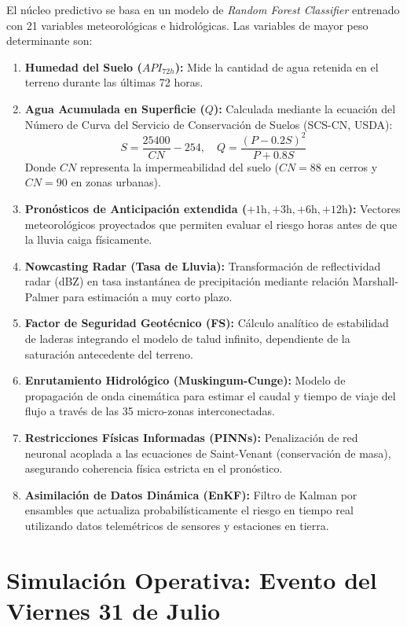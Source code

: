 \documentclass[11pt,a4paper]{article}
\begin{document}
El núcleo predictivo se basa en un modelo de \textit{Random Forest Classifier} entrenado con 21 variables meteorológicas e hidrológicas. Las variables de mayor peso determinante son:

\begin{enumerate}
    \item \textbf{Humedad del Suelo ($API_{72h}$):} Mide la cantidad de agua retenida en el terreno durante las últimas 72 horas.
    \item \textbf{Agua Acumulada en Superficie ($Q$):} Calculada mediante la ecuación del Número de Curva del Servicio de Conservación de Suelos (SCS-CN, USDA):
    \begin{equation}
        S = \frac{25400}{CN} - 254, \quad Q = \frac{(P - 0.2S)^2}{P + 0.8S}
    \end{equation}
    Donde $CN$ representa la impermeabilidad del suelo ($CN=88$ en cerros y $CN=90$ en zonas urbanas).
    \item \textbf{Pronósticos de Anticipación extendida ($+1\text{h}, +3\text{h}, +6\text{h}, +12\text{h}$):} Vectores meteorológicos proyectados que permiten evaluar el riesgo horas antes de que la lluvia caiga físicamente.
    \item \textbf{Nowcasting Radar (Tasa de Lluvia):} Transformación de reflectividad radar (dBZ) en tasa instantánea de precipitación mediante relación Marshall-Palmer para estimación a muy corto plazo.
    \item \textbf{Factor de Seguridad Geotécnico (FS):} Cálculo analítico de estabilidad de laderas integrando el modelo de talud infinito, dependiente de la saturación antecedente del terreno.
    \item \textbf{Enrutamiento Hidrológico (Muskingum-Cunge):} Modelo de propagación de onda cinemática para estimar el caudal y tiempo de viaje del flujo a través de las 35 micro-zonas interconectadas.
    \item \textbf{Restricciones Físicas Informadas (PINNs):} Penalización de red neuronal acoplada a las ecuaciones de Saint-Venant (conservación de masa), asegurando coherencia física estricta en el pronóstico.
    \item \textbf{Asimilación de Datos Dinámica (EnKF):} Filtro de Kalman por ensambles que actualiza probabilísticamente el riesgo en tiempo real utilizando datos telemétricos de sensores y estaciones en tierra.
\end{enumerate}


\section{Simulación Operativa: Evento del Viernes 31 de Julio}
\end{document}
